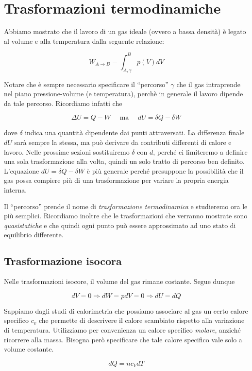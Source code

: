 \section{Trasformazioni termodinamiche}
Abbiamo mostrato che il lavoro di un gas ideale (ovvero a bassa densità)
è legato al volume e alla temperatura dalla seguente relazione:

\[ W_{A\to B} = \int_{A,\gamma}^{B}p(V)dV \]

\noindent Notare che è sempre necessario specificare il ``percorso'' $\gamma$
che il gas intraprende nel piano pressione-volume (e temperatura),
perchè in generale il lavoro dipende da tale percorso. Ricordiamo
infatti che

\[ \Delta U = Q - W \quad\text{ ma }\quad dU = \delta Q - \delta W \]

\noindent dove $\delta$ indica una quantità dipendente dai punti attraversati.
La differenza finale $dU$ sarà sempre la stessa, ma può derivare
da contributi differenti di calore e lavoro. Nelle prossime sezioni
sostituiremo $\delta$ con $d$, perché ci limiteremo a definire una
sola trasformazione alla volta, quindi un solo tratto di percorso
ben definito. L'equazione $dU = \delta Q - \delta W$ è più generale
perché presuppone la possibilità che il gas possa compiere più di una
trasformazione per variare la propria energia interna.

Il ``percorso'' prende il nome di \textit{trasformazione termodinamica}
e studieremo ora le più semplici. Ricordiamo inoltre che le
trasformazioni che verranno mostrate sono \textit{quasistatiche}
e che quindi ogni punto può essere approssimato ad uno stato di
equilibrio differente.

\subsection{Trasformazione isocora}
Nelle trasformazioni isocore, il volume del gas rimane costante.
Segue dunque

\[ dV = 0 \Rightarrow dW = pdV = 0 \Rightarrow dU = dQ \]

\noindent Sappiamo dagli studi di calorimetria che possiamo associare al
gas un certo calore specifico $c_v$ che permette di descrivere il calore
scambiato rispetto alla variazione di temperatura. Utilizziamo per
convenienza un calore specifico \textit{molare}, anziché ricorrere
alla massa. Bisogna però specificare che tale calore specifico
vale solo a volume costante.

\[ dQ = nc_VdT \]

